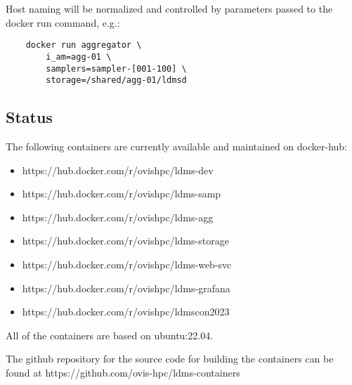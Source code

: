 \documentclass{article}
\begin{document}
Host naming will be normalized and controlled by parameters passed to the docker run command, e.g.:

\begin{verbatim}
    docker run aggregator \
        i_am=agg-01 \
        samplers=sampler-[001-100] \
        storage=/shared/agg-01/ldmsd
\end{verbatim}

\subsection{Status}
The following containers are currently available and maintained on docker-hub:
\begin{itemize}
\item https://hub.docker.com/r/ovishpc/ldms-dev
\item https://hub.docker.com/r/ovishpc/ldms-samp
\item https://hub.docker.com/r/ovishpc/ldms-agg
\item https://hub.docker.com/r/ovishpc/ldms-storage
\item https://hub.docker.com/r/ovishpc/ldms-web-svc
\item https://hub.docker.com/r/ovishpc/ldms-grafana
\item https://hub.docker.com/r/ovishpc/ldmscon2023
\end{itemize}
All of the containers are based on ubuntu:22.04.

The github repository for the source code for building the containers can be found at https://github.com/ovis-hpc/ldms-containers
\end{document}
